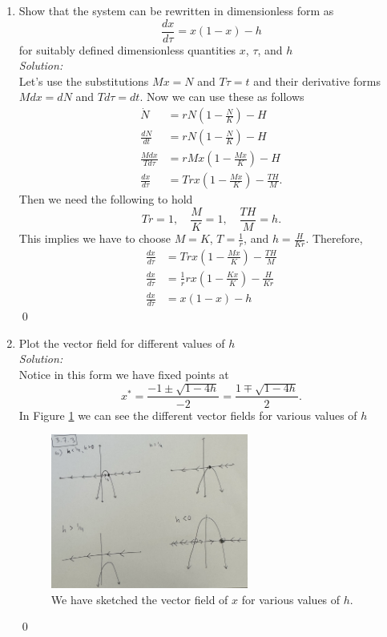 \documentclass[10pt]{amsart}
\theoremstyle{nonumberplain}
\begin{document}
\begin{enumerate}[label={\bf {\arabic*}:}]
\begin{enumerate}

\item Show that the system can be rewritten in dimensionless form as 
$$
\frac {dx}{d\tau} = x(1 - x) - h
$$
for suitably defined dimensionless quantities $x$, $\tau$, and $h$ \\

\noindent
\textit{Solution:} \\
Let's use the substitutions  $Mx = N$ and $T\tau = t$ and their derivative forms $Mdx = dN$ and $Td\tau = dt$.
Now we can use these as follows
\begin{align*}
\dot N &= rN\left( 1 - \frac N K \right) - H \\
\frac {dN}{dt} &= rN\left( 1 - \frac N K \right) - H \\
\frac {Mdx}{Td\tau} &= rMx\left( 1 - \frac {Mx} K \right) - H \\
\frac {dx}{d\tau} &= T rx\left( 1 - \frac {Mx} K \right) - \frac{TH}M.
\end{align*}
Then we need the following to hold
$$Tr = 1, \quad \frac M K = 1, \quad \frac {TH} M = h.$$
This implies we have to choose $M = K$, $T = \frac 1 r$, and $h = \frac H {Kr}$.
Therefore,
\begin{align*}
\frac {dx}{d\tau} &= T rx\left( 1 - \frac {Mx} K \right) - \frac{TH}M \\
\frac {dx}{d\tau} &= \frac 1 r rx\left( 1 - \frac {Kx} K \right) - \frac H {Kr} \\
\frac {dx}{d\tau} &= x\left( 1 - x \right) - h
\end{align*}
\qed \\

\newpage

\item Plot the vector field for different values of $h$ \\

\noindent
\textit{Solution:} \\
Notice in this form we have fixed points at
$$x^* = \frac {-1 \pm \sqrt{1 - 4h}}{-2} = \frac {1 \mp \sqrt{1 - 4h}}{2}.$$
In Figure \ref{fig:f6} we can see the different vector fields for various values of $h$

\begin{figure}[h]
	\centering
	\includegraphics[height=2in]{3_7_3.png}
 	\caption{We have sketched the vector field of $x$ for various values of $h$.}\label{fig:f6}
\end{figure} \qed \\


\end{enumerate}
\end{enumerate}
\end{document}
